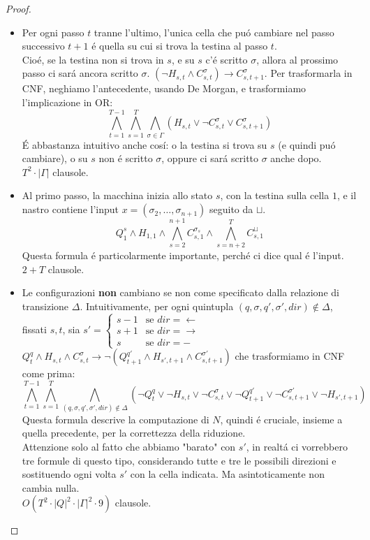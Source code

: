 \begin{proof}
\begin{itemize}
    \item Per ogni passo $t$ tranne l'ultimo, l'unica cella che puó cambiare nel passo successivo $t+1$ é quella su cui si trova la testina al passo $t$.\\
    Cioé, se la testina non si trova in $s$, e su $s$ c'é scritto $\sigma$, allora al prossimo passo ci sará ancora scritto $\sigma$.
    $(\neg H_{s,t} \land C_{s,t}^\sigma) \rightarrow C_{s,t+1}^\sigma$. 
    Per trasformarla in CNF, neghiamo l'antecedente, usando De Morgan, e trasformiamo l'implicazione in OR:
    \[
    \bigwedge_{t=1}^{T-1} \bigwedge_{s=1}^{T} \bigwedge_{\sigma \in \Gamma} \left( H_{s,t} \lor \neg C_{s,t}^\sigma \lor C_{s,t+1}^\sigma \right)
    \]
    É abbastanza intuitivo anche cosí: o la testina si trova su $s$ (e quindi puó cambiare), o su $s$ non é scritto $\sigma$, oppure ci sará scritto $\sigma$ anche dopo.\\
    $T^2 \cdot |\Gamma|$ clausole.\\

    \item Al primo passo, la macchina inizia allo stato $s$, con la testina sulla cella $1$, e il nastro contiene l'input $x = (\sigma_2, \dots, \sigma_{n+1})$ seguito da ${\sqcup}$.
    \[
    Q_1^s \land H_{1,1} \land \bigwedge_{s=2}^{n+1} C_{s, 1}^{\sigma_{s}} \land \bigwedge_{s=n+2}^{T} C_{s, 1}^{\sqcup}
    \]
    Questa formula é particolarmente importante, perché ci dice qual é l'input.\\
    $2 + T$ clausole.\\
    
    \item Le configurazioni \textbf{non} cambiano se non come specificato dalla relazione di transizione $\Delta$.
    Intuitivamente, per ogni quintupla $(q, \sigma, q', \sigma', dir) \notin \Delta$, fissati $s, t$, sia 
    $s' = \begin{cases}
        s-1 & \text{se } dir = \leftarrow \\
        s+1 & \text{se } dir = \rightarrow\\
        s & \text{se } dir = -
    \end{cases}$\\
    $Q_t^q \land H_{s,t} \land C_{s,t}^\sigma \rightarrow \neg (Q_{t+1}^{q'} \land H_{s',t+1} \land  C_{s,t+1}^{\sigma'})$
    che trasformiamo in CNF come prima:
    \[
    \bigwedge_{t=1}^{T-1} \bigwedge_{s=1}^{T} \bigwedge_{(q, \sigma, q', \sigma', dir) \notin \Delta} \left( \neg Q_t^q \lor \neg H_{s,t} \lor \neg C_{s,t}^\sigma \lor \neg Q_{t+1}^{q'} \lor \neg C_{s,t+1}^{\sigma'} \lor \neg H_{s',t+1} \right)
    \]
    Questa formula descrive la computazione di $N$, quindi é cruciale, insieme a quella precedente, per la correttezza della riduzione.\\
    Attenzione solo al fatto che abbiamo "barato" con $s'$, in realtá ci vorrebbero tre formule di questo tipo,
    considerando tutte e tre le possibili direzioni e sostituendo ogni volta $s'$ con la cella indicata.
    Ma asintoticamente non cambia nulla.\\
    $O(T^2 \cdot |Q|^2 \cdot |\Gamma|^2 \cdot 9)$ clausole.\\


\end{itemize}
\end{proof}
